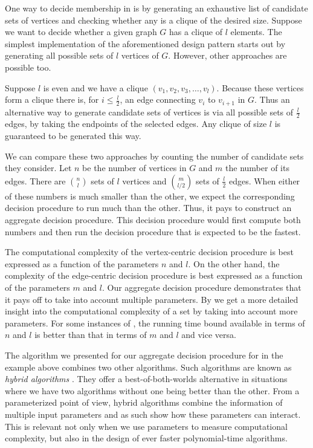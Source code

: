 \begin{example}
  One way to decide membership in  is by generating an exhaustive list of candidate sets of vertices and checking whether any is a clique of the desired size.
  Suppose we want to decide whether a given graph $G$ has a clique of $l$ elements.
  The simplest implementation of the aforementioned design pattern starts out by generating all possible sets of $l$ vertices of $G$.
  However, other approaches are possible too.

  Suppose $l$ is even and we have a clique $(v_1, v_2, v_3, \ldots, v_l)$.
  Because these vertices form a clique there is, for $i \le \frac{l}{2}$, an edge connecting $v_i$ to $v_{i + 1}$ in $G$.
  Thus an alternative way to generate candidate sets of vertices is via all possible sets of $\frac{l}{2}$ edges, by taking the endpoints of the selected edges.
  Any clique of size $l$ is guaranteed to be generated this way.

  We can compare these two approaches by counting the number of candidate sets they consider.
  Let $n$ be the number of vertices in $G$ and $m$ the number of its edges.
  There are $\binom{n}{l}$ sets of $l$ vertices and $\binom{m}{l / 2}$ sets of $\frac{l}{2}$ edges.
  When either of these numbers is much smaller than the other, we expect the corresponding decision procedure to run much than the other.
  Thus, it pays to construct an aggregate decision procedure.
  This decision procedure would first compute both numbers and then run the decision procedure that is expected to be the fastest.

  The computational complexity of the vertex-centric decision procedure is best expressed as a function of the parameters $n$ and $l$.
  On the other hand, the complexity of the edge-centric decision procedure is best expressed as a function of the parameters $m$ and $l$.
  Our aggregate decision procedure demonstrates that it pays off to take into account multiple parameters.
  By we get a more detailed insight into the computational complexity of a set by taking into account more parameters.
  For some instances of , the running time bound available in terms of $n$ and $l$ is better than that in terms of $m$ and $l$ and vice versa.
\end{example}

The algorithm we presented for our aggregate decision procedure for  in the example above combines two other algorithms.
Such algorithms are known as \emph{hybrid algorithms} \parencite{malek1994hybrid}.
They offer a best-of-both-worlds alternative in situations where we have two algorithms without one being better than the other.
From a parameterized point of view, hybrid algorithms combine the information of multiple input parameters and as such show how these parameters can interact.
This is relevant not only when we use parameters to measure computational complexity, but also in the design of ever faster polynomial-time algorithms.

